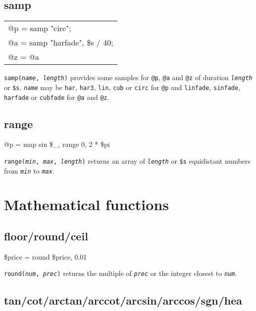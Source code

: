 \documentclass[a4paper, 10pt]{article}
\begin{document}
	\subsection{samp}

	\begin{center} \ttfamily
		\begin{tabular}{l}
			@p = samp "circ";              \\
			@a = samp "harfade", \$s / 40; \\
			@z = @a
		\end{tabular}
	\end{center}
	\texttt{samp(\textit{name}, \textit{length})} provides some samples for \texttt{@p}, \texttt{@a} and \texttt{@z} of duration \texttt{\textit{length}} or \texttt{\$s}. \texttt{\textit{name}} may be \texttt{har}, \texttt{har3}, \texttt{lin}, \texttt{cub} or \texttt{circ} for \texttt{@p} and \texttt{linfade}, \texttt{sinfade}, \texttt{harfade} or \texttt{cubfade} for \texttt{@a} and \texttt{@z}.

	\subsection{range}

	\begin{center} \ttfamily
		@p = map sin \$\_, range 0, 2 * \$pi
	\end{center}
	\texttt{range(\textit{min}, \textit{max}, \textit{length})} returns an array of \texttt{\textit{length}} or \texttt{\$s} equidistant numbers from \texttt{\textit{min}} to \texttt{\textit{max}}.

	\section{Mathematical functions}

	\subsection{floor/round/ceil}

	\begin{center} \ttfamily
		\$price = round \$price, 0.01
	\end{center}
	\texttt{round(\textit{num}, \textit{prec})} returns the multiple of \texttt{\textit{prec}} or the integer closest to \texttt{\textit{num}}.

	\subsection{tan/cot/arctan/arccot/arcsin/arccos/sgn/hea}
\end{document}

